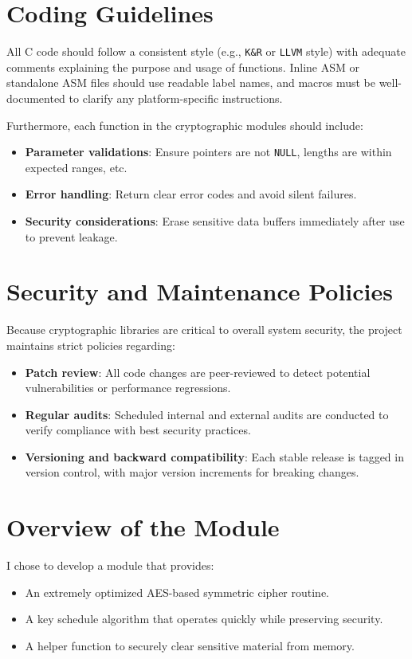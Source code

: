 \documentclass[11pt,a4paper]{report}
\theoremstyle{definitionstyle}
\begin{document}
\section{Coding Guidelines}

All C code should follow a consistent style (e.g., \texttt{K\&R} or \texttt{LLVM} style) with adequate comments explaining the purpose and usage of functions. Inline ASM or standalone ASM files should use readable label names, and macros must be well-documented to clarify any platform-specific instructions.

Furthermore, each function in the cryptographic modules should include:
\begin{itemize}
	\item \textbf{Parameter validations}: Ensure pointers are not \texttt{NULL}, lengths are within expected ranges, etc.
	\item \textbf{Error handling}: Return clear error codes and avoid silent failures.
	\item \textbf{Security considerations}: Erase sensitive data buffers immediately after use to prevent leakage.
\end{itemize}

\section{Security and Maintenance Policies}

Because cryptographic libraries are critical to overall system security, the project maintains strict policies regarding:
\begin{itemize}
	\item \textbf{Patch review}: All code changes are peer-reviewed to detect potential vulnerabilities or performance regressions.
	\item \textbf{Regular audits}: Scheduled internal and external audits are conducted to verify compliance with best security practices.
	\item \textbf{Versioning and backward compatibility}: Each stable release is tagged in version control, with major version increments for breaking changes.
\end{itemize}


\section{Overview of the Module}

I chose to develop a module that provides:
\begin{itemize}
	\item An extremely optimized AES-based symmetric cipher routine.
	\item A key schedule algorithm that operates quickly while preserving security.
	\item A helper function to securely clear sensitive material from memory.
\end{itemize}
\end{document}
